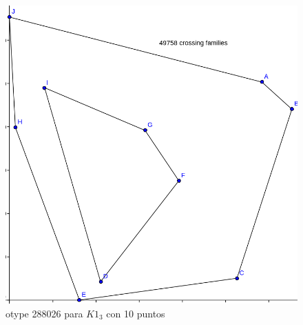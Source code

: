 \documentclass[11pt,epsf,times,letterpaper]{article}
\begin{document}
	\begin{figure}[!h]
		\centering
		\includegraphics[scale=.7]{k13/max10_otype288026.png}
		\caption{otype 288026 para $K1_3$ con 10 puntos}
	\end{figure}
	
	
\end{document}
